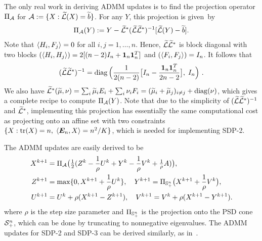 The only real work in deriving ADMM updates is to find the projection operator $\Pi_{\mathcal{A}}$ for $ \mathcal{A} := \{X: \widetilde{\mathcal{L}}(X) = \widetilde{b}\}$. For any $Y$, this projection is given~by 
\begin{align}\label{eq:proj:L:Y}
  \Pi_{\mathcal{A}}(Y) := Y - \widetilde{\mathcal{L}}^* (\widetilde{\mathcal{L}} \widetilde{\mathcal{L}}^*)^{-1}[ \widetilde{\mathcal{L}}(Y) - \widetilde{b}] .
\end{align}
Note that $\langle H_i,F_j\rangle = 0$ for all $i,j = 1, \dots, n$. Hence, $\widetilde{\mathcal{L}} \widetilde{\mathcal{L}}^*$ is block diagonal with two blocks $(\langle H_i,H_j\rangle) = 2[(n-2) I_n + \bm{1}_n \bm{1}_n^T]$ and 
$(\langle F_i,F_j\rangle) = I_n$. It follows that
\begin{align*}
  (\widetilde{\mathcal{L}}\widetilde{\mathcal{L}}^*)^{-1} = \operatorname{diag}\Big(\frac{1}{2(n-2)} 
    \big[ I_n - \frac{\bm{1}_n \bm{1}_n^T}{2n-2} \big],\; I_n \Big) \ . 
\end{align*}
We also have $\widetilde{\mathcal{L}}^*(\widetilde{\mu},\nu) = \sum_i \widetilde{\mu}_i E_i + \sum_i \nu_i F_i =
(\widetilde{\mu}_i + \widetilde{\mu}_j)_{i \neq j} + \operatorname{diag}(\nu)$, which gives a complete
recipe to compute $\Pi_{\mathcal{A}}(Y)$. Note that due to the simplicity of
$(\widetilde{\mathcal{L}} \widetilde{\mathcal{L}}^*)^{-1}$ and $\widetilde{\mathcal{L}}^*$, implementing this projection has
essentially the same computational cost as projecting onto an affine set with two constraints $\{X: \operatorname*{tr}(X) = n,\; \langle \bm{E}_n,X\rangle = n^2/K\}$, which is needed for implementing SDP-2. 


The ADMM updates are easily derived to be
\begin{align*}
  X^{k+1} &= \proj_{\Ac}\big(\tfrac12
  ( Z^k - \frac{1}{\rho}U^k + Y^k - \frac{1}{\rho} V^k +\tfrac1\rho A) \big) , \\
  Z^{k+1}
  &= %
	\max\{0,X^{k+1} + \frac{1}{\rho}U^k\}, \quad 
	Y^{k+1} = \proj_{\psd{n}} \big(X^{k+1} + \frac{1}{\rho}V^k\big), \\
  U^{k+1} &= U^{k} + \rho(X^{k+1}-Z^{k+1}), \quad 
  V^{k+1} = V^{k} + \rho(X^{k+1}-Y^{k+1}).
\end{align*}
where $\rho$ is the step size parameter and $\Pi_{\mathbb{S}^{n}_+}$ is the projection onto the PSD cone $\mathcal{S}_+^n$,
which can be done by truncating to nonnegative eigenvalues. The ADMM
updates for SDP-2 and SDP-3 can be derived similarly, as in~\cite{Cai2014}.



